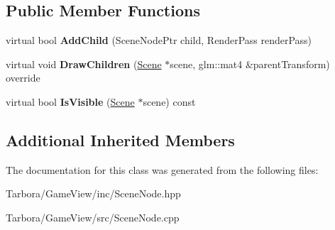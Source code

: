 \subsection*{Public Member Functions}
\begin{DoxyCompactItemize}
\item 
\mbox{\label{classTarbora_1_1RootNode_a95ce817a139455e7a7830bccc3874164}} 
virtual bool {\bfseries Add\+Child} (Scene\+Node\+Ptr child, Render\+Pass render\+Pass)
\item 
\mbox{\label{classTarbora_1_1RootNode_a20d645a7e3db97fc3a332b0dd957982f}} 
virtual void {\bfseries Draw\+Children} (\hyperlink{classTarbora_1_1Scene}{Scene} $\ast$scene, glm\+::mat4 \&parent\+Transform) override
\item 
\mbox{\label{classTarbora_1_1RootNode_a20b9a487a7de21816ca909490d00fcae}} 
virtual bool {\bfseries Is\+Visible} (\hyperlink{classTarbora_1_1Scene}{Scene} $\ast$scene) const
\end{DoxyCompactItemize}
\subsection*{Additional Inherited Members}


The documentation for this class was generated from the following files\+:\begin{DoxyCompactItemize}
\item 
Tarbora/\+Game\+View/inc/Scene\+Node.\+hpp\item 
Tarbora/\+Game\+View/src/Scene\+Node.\+cpp\end{DoxyCompactItemize}
